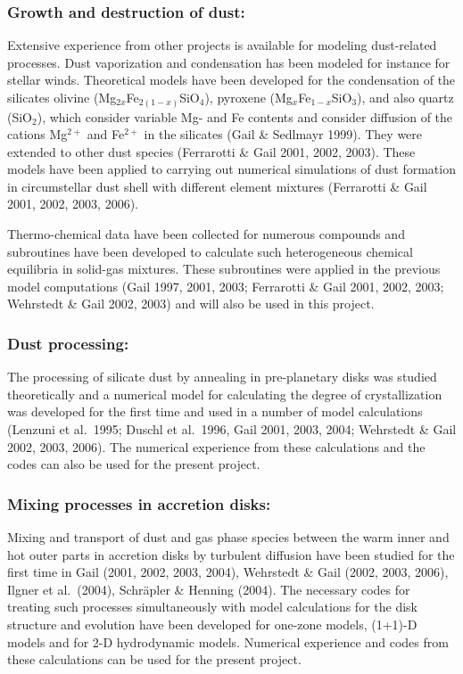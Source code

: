 \subsubsection{Growth and destruction of dust:} Extensive experience from
other projects is available for modeling dust-related processes.
Dust vaporization and condensation has been modeled for instance
for stellar winds. Theoretical models have been developed for the
condensation of the silicates olivine
(Mg$_{2x}$Fe$_{2(1-x)}$SiO$_4$), pyroxene (Mg$_x$Fe$_{1-x
}$SiO$_3$), and also quartz (SiO$_2$), which consider variable Mg-
and Fe contents and consider diffusion of the cations Mg$^{2+}$
and Fe$^{2+}$ in the silicates (Gail \& Sedlmayr 1999). They were
extended to other dust species (Ferrarotti \& Gail 2001, 2002,
2003). These models have been applied to carrying out numerical
simulations of dust formation in circumstellar dust shell with
different element mixtures (Ferrarotti \& Gail 2001, 2002, 2003,
2006).

Thermo-chemical data have been collected for numerous compounds and
subroutines have been developed to calculate such heterogeneous
chemical equilibria in solid-gas mixtures. These subroutines were
applied in the previous model computations (Gail 1997, 2001, 2003;
Ferrarotti \& Gail 2001, 2002, 2003; Wehrstedt \& Gail 2002, 2003)
and will also be used in this project.

\subsubsection{Dust processing:} The processing of silicate dust by
annealing in pre-planetary disks was studied theoretically and a
numerical model for calculating the degree of crystallization was
developed for the first time and used in a number of model
calculations (Lenzuni et al.~1995; Duschl et al.~1996, Gail 2001,
2003, 2004; Wehrstedt \& Gail 2002, 2003, 2006). The numerical
experience from these calculations and the codes can also be used
for the present project.

\subsubsection{Mixing processes in accretion disks:} Mixing and transport of
dust and gas phase species between the warm inner and hot outer
parts in accretion disks by turbulent diffusion have been studied
for the first time in Gail (2001, 2002, 2003, 2004), Wehrstedt \&
Gail (2002, 2003, 2006), Ilgner et al.~(2004), Schr\"apler \&
Henning (2004). The necessary codes for treating such processes
simultaneously with model calculations for the disk structure and
evolution have been developed for one-zone models, (1+1)-D models
and for 2-D hydrodynamic models. Numerical experience and codes
from these calculations can be used for the present project.

